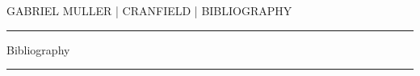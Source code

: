 \documentclass[paper=a4, fontsize=11pt]{scrartcl}
\begin{document}
\begin{center}
\MakeUppercase{Gabriel Muller | Cranfield | Bibliography} 
\end{center}

\rule{\linewidth}{1pt}
\begin{center}
\huge{Bibliography}
\end{center}
\rule{\linewidth}{1pt}\\


\citep{Reference1}
\citep{Reference2}
\citep{Reference3}
\citep{Reference4}
\citep{Reference5}
\citep{Reference6}
\citep{Reference7}
\citep{Reference8}
\citep{Reference9}
\citep{Reference10}
\citep{Reference11}
\citep{Reference12}
\citep{Reference13}
\citep{Reference14}
\citep{Reference15}
\citep{Reference16}
\citep{Reference17}
\citep{Reference18}
\citep{Reference19}
\citep{Reference20}
\citep{Reference21}
\citep{Reference22}
\citep{Reference23}
\citep{Reference24}
\citep{Reference25}
\citep{Reference26}
\citep{Reference27}
\citep{Reference28}
\citep{Reference29}
\citep{Reference30}
\citep{Reference31}
\citep{Reference32}
\citep{Reference33}
\citep{Reference34}
\citep{Reference35}
\citep{Reference36}
\citep{Reference37}
\citep{Reference38}
\citep{Reference39}
\citep{Reference40}



\end{document}
